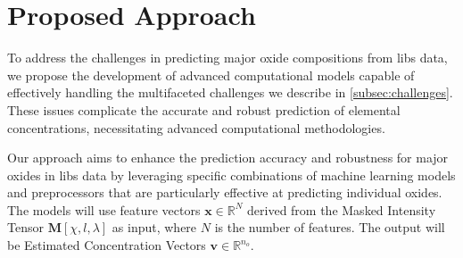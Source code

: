 \section{Proposed Approach}\label{sec:proposed_approach}
To address the challenges in predicting major oxide compositions from \gls{libs} data, we propose the development of advanced computational models capable of effectively handling the multifaceted challenges we describe in \ref{subsec:challenges}.
These issues complicate the accurate and robust prediction of elemental concentrations, necessitating advanced computational methodologies.

Our approach aims to enhance the prediction accuracy and robustness for major oxides in \gls{libs} data by leveraging specific combinations of machine learning models and preprocessors that are particularly effective at predicting individual oxides.
The models will use feature vectors $\mathbf{x} \in \mathbb{R}^N$ derived from the Masked Intensity Tensor $\mathbf{M}[\chi, l, \lambda]$ as input, where $N$ is the number of features.
The output will be Estimated Concentration Vectors $\mathbf{v} \in \mathbb{R}^{n_o}$.

